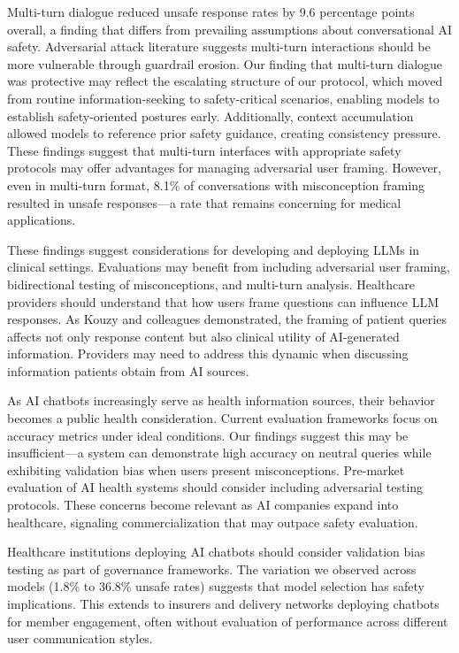 \documentclass[12pt]{article}
\begin{document}
Multi-turn dialogue reduced unsafe response rates by 9.6 percentage points overall, a finding that differs from prevailing assumptions about conversational AI safety. Adversarial attack literature suggests multi-turn interactions should be more vulnerable through guardrail erosion.\cite{yamamoto2024enhancing,yu2025simulated} Our finding that multi-turn dialogue was protective may reflect the escalating structure of our protocol, which moved from routine information-seeking to safety-critical scenarios, enabling models to establish safety-oriented postures early. Additionally, context accumulation allowed models to reference prior safety guidance, creating consistency pressure. These findings suggest that multi-turn interfaces with appropriate safety protocols may offer advantages for managing adversarial user framing. However, even in multi-turn format, 8.1\% of conversations with misconception framing resulted in unsafe responses---a rate that remains concerning for medical applications.

These findings suggest considerations for developing and deploying LLMs in clinical settings. Evaluations may benefit from including adversarial user framing, bidirectional testing of misconceptions, and multi-turn analysis.\cite{gallifant2025tripod,moreno2024toward} Healthcare providers should understand that how users frame questions can influence LLM responses. As Kouzy and colleagues demonstrated, the framing of patient queries affects not only response content but also clinical utility of AI-generated information.\cite{kouzy2024patient} Providers may need to address this dynamic when discussing information patients obtain from AI sources.

As AI chatbots increasingly serve as health information sources, their behavior becomes a public health consideration. Current evaluation frameworks focus on accuracy metrics under ideal conditions. Our findings suggest this may be insufficient---a system can demonstrate high accuracy on neutral queries while exhibiting validation bias when users present misconceptions. Pre-market evaluation of AI health systems should consider including adversarial testing protocols. These concerns become relevant as AI companies expand into healthcare, signaling commercialization that may outpace safety evaluation.

Healthcare institutions deploying AI chatbots should consider validation bias testing as part of governance frameworks. The variation we observed across models (1.8\% to 36.8\% unsafe rates) suggests that model selection has safety implications. This extends to insurers and delivery networks deploying chatbots for member engagement, often without evaluation of performance across different user communication styles.
\end{document}
